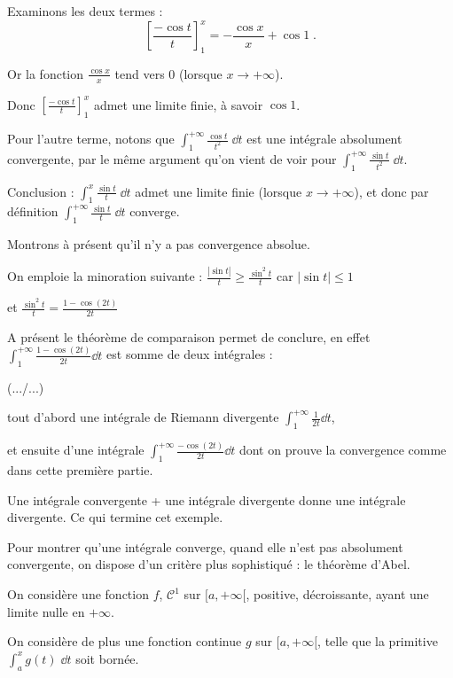 \change
Examinons les deux termes :
$$\left[\frac{-\cos t}{t}\right]_1^x 
= -\frac{\cos x}{x}+\cos 1 \; .$$
    

Or la fonction $\frac{\cos x}{x}$ tend vers $0$ 
(lorsque $x \to +\infty$).

\change
Donc $\left[\frac{-\cos t}{t}\right]_1^x$ admet une 
limite finie, à savoir $\cos 1$. 

\change
Pour l'autre terme, notons que 
$\int_1^{+\infty} \frac{\cos t}{t^2}\;\dd t$ est 
une intégrale absolument convergente, 
par le même argument qu'on vient de voir 
pour $\int_1^{+\infty} \frac{\sin t}{t^2}\;\dd t$.

Conclusion : $\int_1^x \frac{\sin t}{t}\;\dd t$ admet 
une limite finie (lorsque $x\to+\infty$), et 
donc par définition $\int_1^{+\infty} \frac{\sin t}{t}\;\dd t$ converge.


\change
Montrons à présent qu'il n'y a pas convergence absolue. 

\change
On emploie la minoration suivante :
$\frac{|\sin t|}{t} \ge \frac{\sin^2 t}{t}$
car $\big| \sin t \big|\le 1$

\change
et $\frac{\sin^2 t}{t}= \frac{1-\cos(2t)}{2t}$

\change
A présent le théorème de comparaison permet 
de conclure, en effet $\int_1^{+\infty}\frac{1-\cos(2t)}{2t} \dd t$ 
est somme de deux intégrales :

(.../...) \newpage

\change
tout d'abord une intégrale de Riemann divergente 
$\int_1^{+\infty}\frac{1}{2t} \dd t$,

et ensuite d'une intégrale $\int_1^{+\infty}\frac{-\cos(2t)}{2t} \dd t$ 
dont on prouve la convergence comme dans cette première partie.

\change
Une intégrale convergente + une intégrale divergente donne une intégrale divergente.
Ce qui termine cet exemple.


\diapo

Pour montrer qu'une intégrale converge, 
quand elle n'est pas absolument convergente, 
on dispose d'un critère plus sophistiqué : le théorème d'Abel.

On considère une fonction $f$,  $\mathcal{C}^1$ sur $[a,+\infty[$, positive,
décroissante, ayant une limite nulle en $+\infty$.

On considère de plus une fonction continue $g$ sur $[a,+\infty[$, telle que la
primitive $\int_a^x g(t)\;\dd t$ soit bornée.

